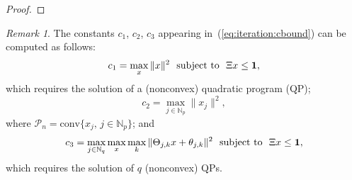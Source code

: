 \documentclass[journal]{IEEEtran}
\newcommand{\todo}[2]{%
  \providetoggle{#1}%
    \iftoggle{#1}{%
    {\color{red}#2}%
    }{#2}%
}
\providecommand{\conv}{\text{conv}}
\newcounter{thmcount}
\theoremstyle{remark}
\newtheorem{rem}[thmcount]{Remark}
\theoremstyle{definition}
\begin{document}
\begin{proof}
\todo{Mark:proof:cor15}{%
\def\X{\mathcal{X}}%
\def\D{\mathcal{D}}%
\def\V{\mathcal{V}}%
\def\E{\mathcal{E}}%
%
The iteration (\ref{eq:Xk:iteration}) can be defined  equivalently as $\X_0=\X$ and $\X_k = \X_{k-1} \cap \D_k^\prime$ for $k=1,2,\ldots$, with
\[
\D_k^\prime = \bigl\{ x\in\X_{k-1} : \{\Psi x\} \oplus \V(x) If \subseteq \D_{k-1}^\prime\}
\]
for $k=1,2,\ldots$ and $\D_0^\prime=\X$. Clearly $\X_k\subseteq \X$ for all $k$, and since $V_1(x)\subseteq c_3\E$ for all $x\in\X$ (where $\E = B_1(0)$), it follows that $\D^\prime_k \supseteq \Psi^{-1}(\D_{k-1}^\prime \ominus c_3\E)$ and 
\[
\D_k^\prime 
\supseteq 
\Psi^{-k} \Bigl[ \X \ominus \bigoplus_{i=0}^{k-1} c_3\Psi^i\E \Bigr]
\supseteq 
\Bigl[ c_1 - \Bigl(\frac{1-\rho^k}{1-\rho} \Bigr) c_3\Bigr] \rho^{-k}\mathcal{E} 
\]
since $\X\subseteq c_1\E$. 
%
Therefore $\D_k^\prime\neq \emptyset$ for all $k$ if $c_1 > (1-\rho)^{-1}c_3$, and in this case, since $\X_{k-1} \subseteq \mathcal{P}_n\subseteq c_2\E$ for all $k\geq n+1$, we have $\X_{k-1}\subseteq \D_k^\prime$ if $c_2\rho^k \leq c_1 - c_3(1-\rho^k)/(1-\rho)$. 
%
Hence $\X^\infty=\X_M$, where $M$ is 
the smallest integer such that $k= M+1$ satisfies this condition, which is given by (\ref{eq:iteration:cbound})
since $c_2>(1-\rho)^{-1}c_3$ is assumed.}
%
\end{proof}

\begin{rem}
The constants $c_1$, $c_2$, $c_3$ appearing in~(\ref{eq:iteration:cbound}) can be computed as follows:
\[
c_1 = \max_x \|x\|^2 \ \ \text{subject to} \ \  \Xi x\leq {\bf 1} ,
\]
which requires the solution of a (nonconvex) quadratic program (QP);
\[
c_2 = \max_{j\in\mathbb{N}_p} \|x_j\|^2 ,
\]
where 
$\mathcal{P}_n  =\conv\{x_j,\, j\in\mathbb{N}_p\}$; 
and
\[
c_3 = \max_{j\in\mathbb{N}_q} \max_x \todo{Manuel:convHull}{\max_k} \|\Theta_{j\todo{Manuel:convHull}{,k}} x + \theta_{j\todo{Manuel:convHull}{,k}}\|^2 \ \  \text{subject to} \ \ \Xi x \leq {\bf 1} ,
\]
which requires the solution of $q$ (nonconvex) QPs.
\end{rem}
\end{document}
